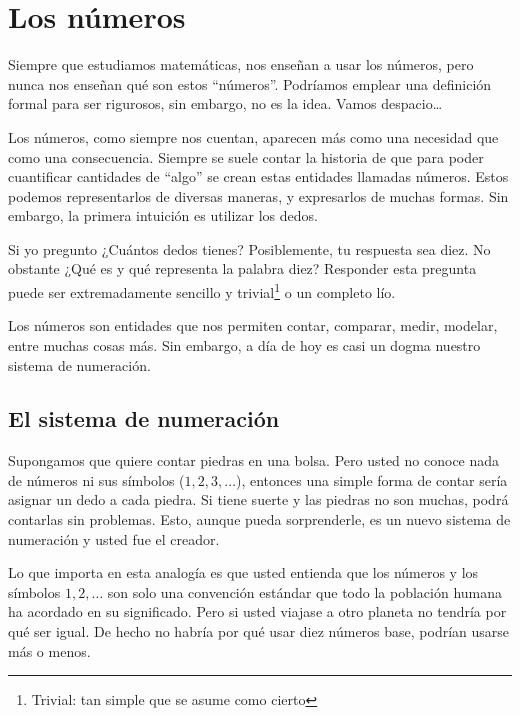 \chapter{Los números}
Siempre que estudiamos matemáticas, nos enseñan a usar los números, pero nunca nos enseñan qué son estos ``números''. Podríamos emplear una definición formal para ser rigurosos, sin embargo, no es la idea. Vamos despacio\dots

Los números, como siempre nos cuentan, aparecen más como una necesidad que como una consecuencia. Siempre se suele contar la historia de que para poder cuantificar cantidades de ``algo'' se crean estas entidades llamadas números. Estos podemos representarlos de diversas maneras, y expresarlos de muchas formas. Sin embargo, la primera intuición es utilizar los dedos. 

Si yo pregunto ¿Cuántos dedos tienes? Posiblemente, tu respuesta sea diez. No obstante ¿Qué es y qué representa la palabra diez? Responder esta pregunta puede ser extremadamente sencillo y trivial\footnote{Trivial: tan simple que se asume como cierto} o un completo lío. 

Los números son entidades que nos permiten contar, comparar, medir, modelar, entre muchas cosas más. Sin embargo, a día de hoy es casi un dogma nuestro sistema de numeración. 

\section{El sistema de numeración}

Supongamos que quiere contar piedras en una bolsa. Pero usted no conoce nada de números ni sus símbolos (\(1,2,3,\dots\)), entonces una simple forma de contar sería asignar un dedo a cada piedra. Si tiene suerte y las piedras no son muchas, podrá contarlas sin problemas. Esto, aunque pueda sorprenderle, es un nuevo sistema de numeración y usted fue el creador. 

Lo que importa en esta analogía es que usted entienda que los números y los símbolos \(1,2,\dots\) son solo una convención estándar que todo la población humana ha acordado en su significado. Pero si usted viajase a otro planeta no tendría por qué ser igual. De hecho no habría por qué usar diez números base, podrían usarse más o menos.

